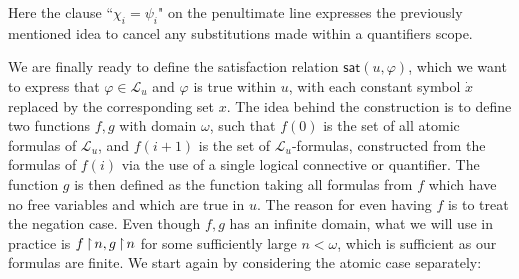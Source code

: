 Here the clause ``$\chi_i=\psi_i$" on the penultimate line expresses the previously mentioned idea to cancel any substitutions made within a quantifiers scope.


We are finally ready to define the satisfaction relation $\mathsf{sat}(u,\varphi)$, which we want to express that $\varphi\in\mathscr L_u$ and $\varphi$ is true within $u$, with each constant symbol $\dot x$ replaced by the corresponding set $x$. The idea behind the construction is to define two functions $f,g$ with domain $\omega$, such that $f(0)$ is the set of all atomic formulas of $\mathscr L_u$, and $f(i+1)$ is the set of $\mathscr L_u$-formulas, constructed from the formulas of $f(i)$ via the use of a single logical connective or quantifier. The function $g$ is then defined as the function taking all formulas from $f$ which have no free variables and which are true in $u$. The reason for even having $f$ is to treat the negation case. Even though $f,g$ has an infinite domain, what we will use in practice is $f\operatorname{\upharpoonright} n, g\operatorname{\upharpoonright} n$ for some sufficiently large $n<\omega$, which is sufficient as our formulas are finite. We start again by considering the atomic case separately:


